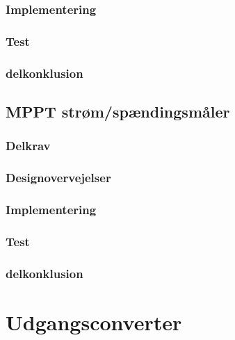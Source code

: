\documentclass[../main.tex]{subfiles}
\begin{document}
        \subsubsection{Implementering}
            
            
            
            
        \subsubsection{Test}
            
            
            
            
        \subsubsection{delkonklusion}
            
            
            
            
    \subsection{MPPT strøm/spændingsmåler}
            
        \subsubsection{Delkrav}
            
        \subsubsection{Designovervejelser}
            
        \subsubsection{Implementering}
            
        \subsubsection{Test}
            
        \subsubsection{delkonklusion}
            
            
                    
\section{Udgangsconverter}
        
\end{document}
